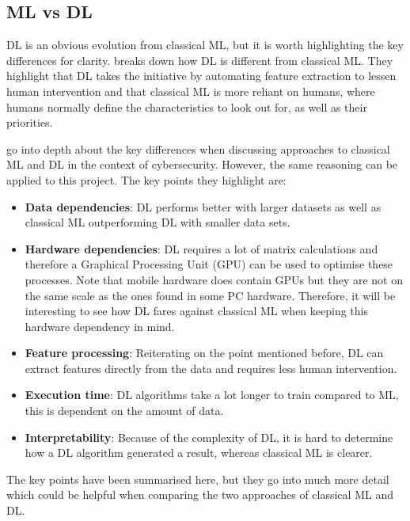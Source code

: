 \documentclass[12pt,a4paper]{report}
\begin{document}
\subsection{ML vs DL}
\label{subsec:mlvsdl}

DL is an obvious evolution from classical ML, but it is worth highlighting the key differences for clarity. 
\citet{kav2020} breaks down how DL is different 
from classical ML. They highlight that DL takes the initiative by automating feature extraction to lessen human intervention and 
that classical ML is more reliant on humans, where humans normally define the characteristics to look out for, as well as their 
priorities.

\par

\citet{8359287} go into depth about the key differences when discussing approaches to classical ML and DL in the 
context of cybersecurity. However, the same reasoning can be applied to this project. The key points they highlight 
are:

\begin{itemize}
    \item \textbf{Data dependencies}: DL performs better with larger datasets as well as
    classical ML outperforming DL with smaller data sets.
    \item \textbf{Hardware dependencies}: DL requires a lot of matrix calculations and therefore a Graphical Processing 
    Unit (GPU) can be used to optimise these processes. Note that mobile hardware does contain GPUs but they are
    not on the same scale as the ones found in some PC hardware. Therefore, it will be interesting to see how DL 
    fares against classical ML when keeping this hardware dependency in mind.
    \item \textbf{Feature processing}: Reiterating on the point mentioned before, DL can extract features directly 
    from the data and requires less human intervention.
    \item \textbf{Execution time}: DL algorithms take a lot longer to train compared to ML, this is dependent on the amount of 
    data.
    \item \textbf{Interpretability}: Because of the complexity of DL, it is hard to determine how a DL algorithm generated a 
    result, whereas classical ML is clearer.
\end{itemize}

The key points have been summarised here, but they go into much more detail which could be helpful when
comparing the two approaches of classical ML and DL.
\end{document}
